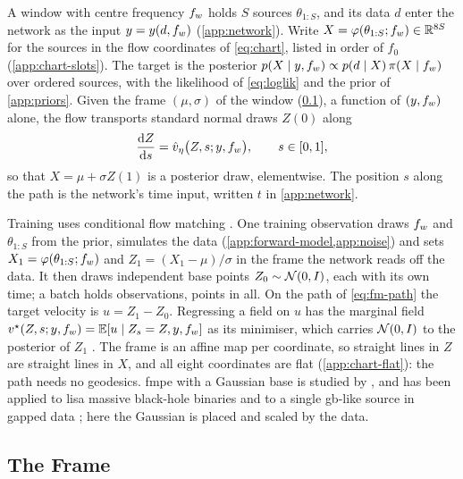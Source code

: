 A window with centre frequency $f_{w}$ holds $S$ sources $\theta_{1:S}$, and its data $d$ enter the
network as the input $y = y(d,f_{w})$ (\cref{app:network}). Write $X = \varphi(\theta_{1:S};f_{w})\in
\mathbb{R}^{8S}$ for the sources in the flow coordinates of \cref{eq:chart}, listed in order of $f_0$
(\cref{app:chart-slots}). The target is the posterior $p(X\mid y,f_{w})\propto p(d\mid
X)\,\pi(X\mid f_{w})$ over ordered sources, with the likelihood of \cref{eq:loglik} and the prior of
\cref{app:priors}. Given the frame $(\mu,\sigma)$ of the window (\cref{app:fm-frame}), a function
of $(y,f_{w})$ alone, the flow transports standard normal draws $Z(0)$ along
\begin{equation}
  \frac{\mathrm{d} Z}{\mathrm{d} s} = \hat v_{\eta}\bigl(Z, s; y, f_{w}\bigr),\qquad s\in[0,1],
  \label{eq:fm-ode}
\end{equation}
so that $X = \mu + \sigma Z(1)$ is a posterior draw, elementwise. The position $s$ along the path is
the network's time input, written $t$ in \cref{app:network}.

Training uses conditional flow matching \citep{lipman2023flow,liu2023flow,albergo2023building}.
One training observation draws $f_{w}$ and $\theta_{1:S}$ from the prior, simulates the data
(\cref{app:forward-model,app:noise}) and sets $X_1 = \varphi(\theta_{1:S};f_{w})$ and
$Z_1 = (X_1-\mu)/\sigma$ in the frame the network reads off the data. It then draws
\FlowMatchingDraws{} independent base points $Z_0\sim\mathcal{N}(0,I)$, each with its own time; a batch
holds \FlowMatchingWindows{} observations, \FlowMatchingBatch{} points in all. On the path of
\cref{eq:fm-path} the target velocity is $u = Z_1 - Z_0$. Regressing a field on $u$ has the marginal
field $v^\star(Z,s;y,f_{w}) = \mathbb{E}[u\mid Z_s = Z, y,f_{w}]$ as its minimiser, which carries $\mathcal{N}(0,I)$
to the posterior of $Z_1$ \citep{lipman2023flow}. The frame is an affine map per coordinate, so
straight lines in $Z$ are straight lines in $X$, and all eight coordinates are flat
(\cref{app:chart-flat}): the path needs no geodesics. \Ac{fmpe} with a Gaussian base is studied by
\citet{dax2023flow}, and has been applied to \ac{lisa} massive black-hole binaries
\citep{liang2024rapid} and to a single \ac{gb}-like source in gapped data \citep{mao2025robust};
here the Gaussian is placed and scaled by the data.

\subsection{The Frame}
\label{app:fm-frame}

